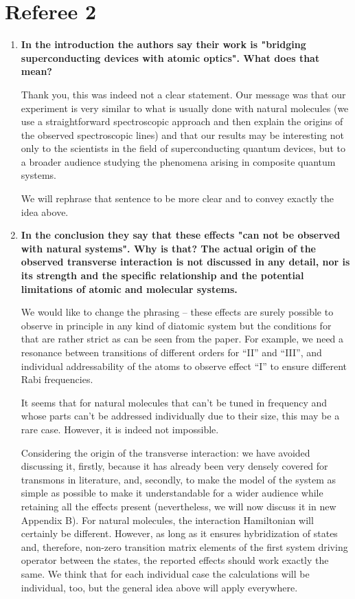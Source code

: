 \documentclass{article}
\begin{document}
\section{Referee 2}


\begin{enumerate}
	\item \textbf{ In the introduction the authors say their work is "bridging
		superconducting devices with atomic optics". What does that mean?}
	
Thank you, this was indeed not a clear statement. Our message was that our experiment is very similar to what is usually done with natural molecules (we use a straightforward spectroscopic approach and then explain the origins of the observed spectroscopic lines) and that our results may be interesting not only to the scientists in the field of superconducting quantum devices, but to a broader audience studying the phenomena arising in composite quantum systems. 

We will rephrase that sentence to be more clear and to convey exactly the idea above.

	\item \textbf{In the conclusion they say that these effects "can not be observed
		with natural systems". Why is that? The actual origin of the observed
		transverse interaction is not discussed in any detail, nor is its
		strength and the specific relationship and the potential limitations
		of atomic and molecular systems.}
	
	We would like to change the phrasing -- these effects are surely possible to observe in principle in any kind of diatomic system but the conditions for that are rather strict as can be seen from the paper. For example, we need a resonance between transitions of different orders for ``II'' and ``III'', and individual addressability of the atoms to observe effect ``I'' to ensure different Rabi frequencies. 
	
	It seems that for natural molecules that can't be tuned in frequency and whose parts can't be addressed individually due to their size, this may be a rare case. However, it is indeed not impossible.
	
	Considering the origin of the transverse interaction: we have avoided discussing it, firstly, because it has already been very densely covered for transmons in literature, and, secondly, to make the model of the system as simple as possible to make it understandable for a wider audience while retaining all the effects present (nevertheless, we will now discuss it in new Appendix B). For natural molecules, the interaction Hamiltonian will certainly be different. However, as long as it ensures hybridization of states and, therefore, non-zero transition matrix elements of the first system driving operator between the states, the reported effects should work exactly the same. We think that for each individual case the calculations will be individual, too, but the general idea above will apply everywhere.
	

\end{enumerate}
\end{document}
